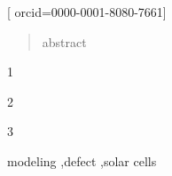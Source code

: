 \documentclass[a4paper,fleqn]{cas-sc}
\begin{document}


\author{Oleksii Zavhorodnii}[
       orcid=0000-0001-8080-7661]









\begin{abstract}
abstract
\end{abstract}


\begin{highlights}
\item 1
\item 2
\item 3
\end{highlights}

\begin{keywords}
 modeling \sep defect \sep solar cells
\end{keywords}
\end{document}
